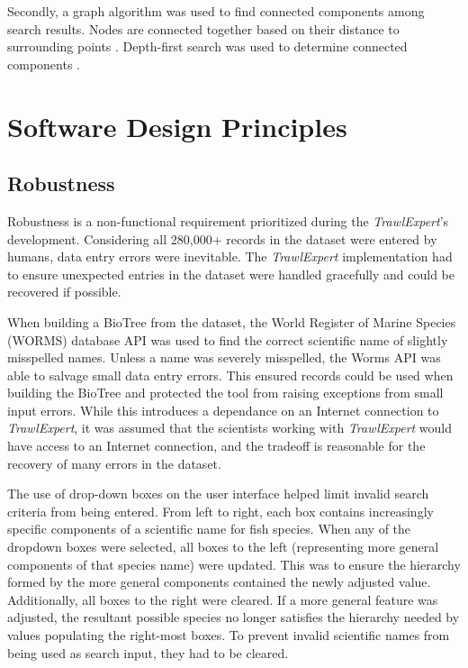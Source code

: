 \documentclass{article}
\begin{document}
Secondly, a graph algorithm was used to find connected components among search results. Nodes are connected together based on their distance to surrounding points \citep{tom10}. Depth-first search was used to determine connected components \citep{broder2000graph}.

\section{Software Design Principles}
\subsection{Robustness}
Robustness is a non-functional requirement prioritized during the \textit{TrawlExpert}'s development. Considering all 280,000+ records in the dataset were entered by humans, data entry errors were inevitable. The \textit{TrawlExpert} implementation had to ensure unexpected entries in the dataset were handled gracefully and could be recovered if possible. 

When building a BioTree from the dataset, the World Register of Marine Species (WORMS) database API was used to find the correct scientific name of slightly misspelled names. Unless a name was severely misspelled, the Worms API was able to salvage small data entry errors. This ensured records could be used when building the BioTree and protected the tool from raising exceptions from small input errors. While this introduces a dependance on an Internet connection to \textit{TrawlExpert}, it was assumed that the scientists working with \textit{TrawlExpert} would have access to an Internet connection, and the tradeoff is reasonable for the recovery of many errors in the dataset.

The use of drop-down boxes on the user interface helped limit invalid search criteria from being entered. From left to right, each box contains increasingly specific components of a scientific name for fish species. When any of the dropdown boxes were selected, all boxes to the left (representing more general components of that species name) were updated. This was to ensure the hierarchy formed by the more general components contained the newly adjusted value. Additionally, all boxes to the right were cleared. If a more general feature was adjusted, the resultant possible species no longer satisfies the hierarchy needed by values populating the right-most boxes. To prevent invalid scientific names from being used as search input, they had to be cleared. 
\end{document}

